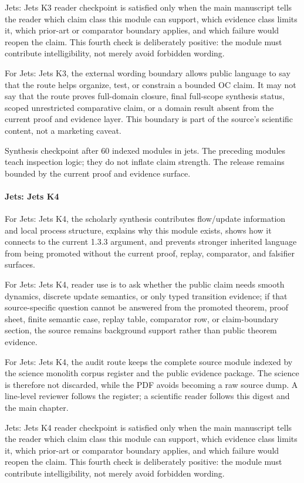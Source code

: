 Jets: Jets K3 reader checkpoint is satisfied only when the main manuscript tells the reader which claim class this module can support, which evidence class limits it, which prior-art or comparator boundary applies, and which failure would reopen the claim. This fourth check is deliberately positive: the module must contribute intelligibility, not merely avoid forbidden wording.


For Jets: Jets K3, the external wording boundary allows public language to say that the route helps organize, test, or constrain a bounded OC claim. It may not say that the route proves full-domain closure, final full-scope synthesis status, scoped unrestricted comparative claim, or a domain result absent from the current proof and evidence layer. This boundary is part of the source's scientific content, not a marketing caveat.


Synthesis checkpoint after 60 indexed modules in jets. The preceding modules teach inspection logic; they do not inflate claim strength. The release remains bounded by the current proof and evidence surface.


\paragraph{Jets: Jets K4}

For Jets: Jets K4, the scholarly synthesis contributes flow/update information and local process structure, explains why this module exists, shows how it connects to the current 1.3.3 argument, and prevents stronger inherited language from being promoted without the current proof, replay, comparator, and falsifier surfaces.


For Jets: Jets K4, reader use is to ask whether the public claim needs smooth dynamics, discrete update semantics, or only typed transition evidence; if that source-specific question cannot be answered from the promoted theorem, proof sheet, finite semantic case, replay table, comparator row, or claim-boundary section, the source remains background support rather than public theorem evidence.


For Jets: Jets K4, the audit route keeps the complete source module indexed by the science monolith corpus register and the public evidence package. The science is therefore not discarded, while the PDF avoids becoming a raw source dump. A line-level reviewer follows the register; a scientific reader follows this digest and the main chapter.


Jets: Jets K4 reader checkpoint is satisfied only when the main manuscript tells the reader which claim class this module can support, which evidence class limits it, which prior-art or comparator boundary applies, and which failure would reopen the claim. This fourth check is deliberately positive: the module must contribute intelligibility, not merely avoid forbidden wording.


